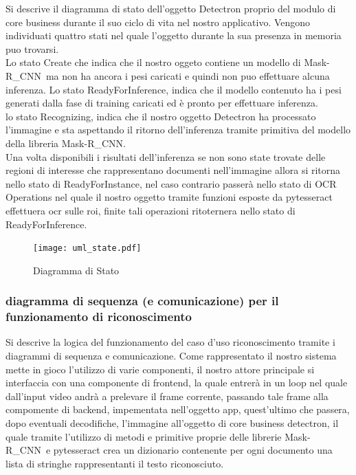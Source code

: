 \documentclass[12pt,a4paper]{article}
\newcommand{\mrcnn}{Mask-R\_CNN}
\begin{document}
Si descrive il diagramma di stato dell'oggetto Detectron proprio del
modulo di core business durante il suo ciclo di vita  nel nostro
applicativo.
Vengono individuati quattro stati nel quale l'oggetto durante la sua presenza
in memoria puo trovarsi.\\
Lo stato Create che indica che il nostro oggeto contiene un modello di
\mrcnn\ ma non ha ancora i pesi caricati e quindi non puo effettuare
alcuna inferenza.
Lo stato ReadyForInference, indica che il modello contenuto ha i pesi
generati dalla fase di training caricati ed è pronto per effettuare
inferenza.\\
lo stato Recognizing, indica che il nostro oggetto Detectron ha
processato l'immagine e sta aspettando il ritorno dell'inferenza tramite
primitiva del modello della libreria \mrcnn.\\
Una volta disponibili i risultati dell'inferenza se non sono state trovate
delle regioni di interesse che rappresentano documenti nell'immagine
allora si ritorna nello stato di ReadyForInstance, nel caso contrario
passerà nello stato di OCR Operations nel quale il nostro oggetto
tramite funzioni esposte da pytesseract effettuera ocr sulle roi, finite
tali operazioni ritoternera nello stato di ReadyForInference.

\begin{figure}[H]
    \caption{Diagramma di Stato}
    \centering
    \texttt{[image: uml\_state.pdf]}
\end{figure}

\subsubsection{diagramma di sequenza (e comunicazione) per il
funzionamento di riconoscimento}

Si descrive la logica del funzionamento del caso d'uso riconoscimento
tramite i diagrammi di sequenza e comunicazione.
Come rappresentato il nostro sistema mette in gioco l'utilizzo di varie
componenti, il nostro attore principale si interfaccia con una
componente di frontend, la quale entrerà in un loop nel quale dall'input
video andrà a prelevare il frame corrente, passando tale frame alla
compomente di backend, impementata nell'oggetto app, quest'ultimo che
passera, dopo eventuali decodifiche, l'immagine all'oggetto di core
business detectron, il quale tramite l'utilizzo di metodi e primitive
proprie delle librerie \mrcnn\ e pytesseract crea un dizionario
contenente per ogni documento una lista di stringhe rappresentanti il
testo riconosciuto.
\end{document}

